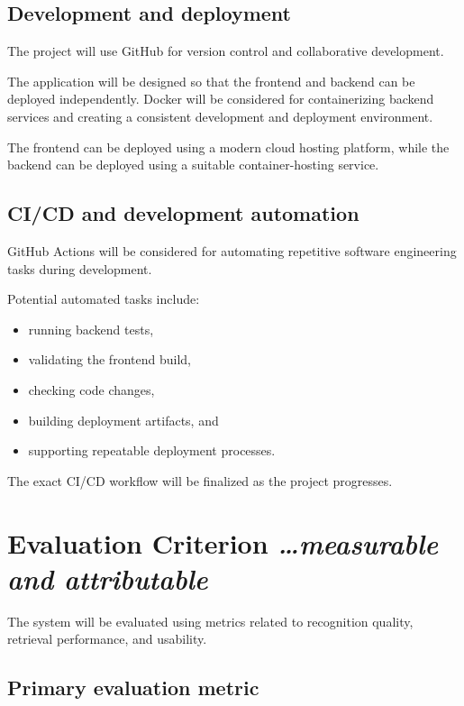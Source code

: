 \documentclass[11pt,a4paper]{article}
\newcommand{\BvrHint}[1]{%
  {\normalfont\normalsize\itshape\hfill #1}}
\begin{document}
\subsection{Development and deployment}

The project will use GitHub for version control and collaborative
development.

The application will be designed so that the frontend and backend can
be deployed independently. Docker will be considered for
containerizing backend services and creating a consistent development
and deployment environment.

The frontend can be deployed using a modern cloud hosting platform,
while the backend can be deployed using a suitable container-hosting
service.

\subsection{CI/CD and development automation}

GitHub Actions will be considered for automating repetitive software
engineering tasks during development.

Potential automated tasks include:

\begin{itemize}[leftmargin=0.7cm]

    \item running backend tests,
    \item validating the frontend build,
    \item checking code changes,
    \item building deployment artifacts, and
    \item supporting repeatable deployment processes.

\end{itemize}

The exact CI/CD workflow will be finalized as the project progresses.

\section{Evaluation Criterion%
  \BvrHint{\ldots measurable and attributable}}

The system will be evaluated using metrics related to recognition
quality, retrieval performance, and usability.

\subsection{Primary evaluation metric}
\end{document}
